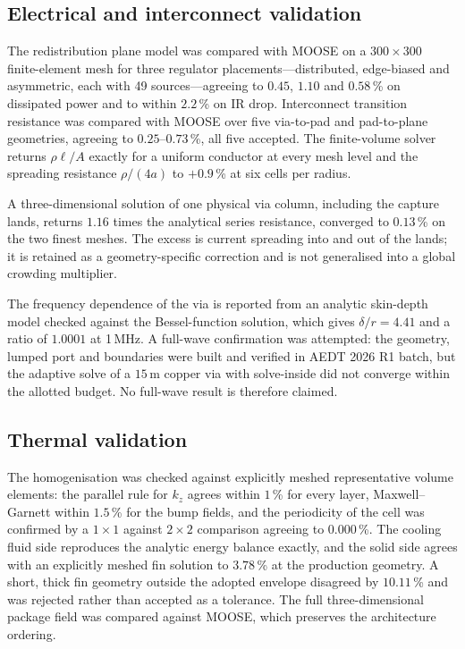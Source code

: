 \documentclass[journal]{IEEEtran}
\begin{document}
\subsection{Electrical and interconnect validation}
The redistribution plane model was compared with MOOSE on a $300\times300$ finite-element
mesh for three regulator placements---distributed, edge-biased and asymmetric, each with 49
sources---agreeing to $0.45$, $1.10$ and $0.58$\,\% on dissipated power and to within
$2.2$\,\% on IR drop. Interconnect transition resistance was compared with MOOSE over five
via-to-pad and pad-to-plane geometries, agreeing to $0.25$--$0.73$\,\%, all five accepted.
The finite-volume solver returns $\rho\ell/A$ exactly for a uniform conductor at every mesh
level and the spreading resistance $\rho/(4a)$ to $+0.9$\,\% at six cells per radius.

A three-dimensional solution of one physical via column, including the capture lands,
returns $1.16$ times the analytical series resistance, converged to $0.13$\,\% on the two
finest meshes. The excess is current spreading into and out of the lands; it is retained as a
geometry-specific correction and is not generalised into a global crowding multiplier.

The frequency dependence of the via is reported from an analytic skin-depth model checked
against the Bessel-function solution, which gives $\delta/r = 4.41$ and a ratio of $1.0001$
at 1\,MHz. A full-wave confirmation was attempted: the geometry, lumped port and boundaries
were built and verified in AEDT 2026 R1 batch, but the adaptive solve of a
$15$\,\textmu m copper via with solve-inside did not converge within the allotted budget. No
full-wave result is therefore claimed.

\subsection{Thermal validation}
The homogenisation was checked against explicitly meshed representative volume elements: the
parallel rule for $k_{z}$ agrees within $1$\,\% for every layer, Maxwell--Garnett within
$1.5$\,\% for the bump fields, and the periodicity of the cell was confirmed by a $1\times1$
against $2\times2$ comparison agreeing to $0.000$\,\%. The cooling fluid side reproduces the
analytic energy balance exactly, and the solid side agrees with an explicitly meshed fin
solution to $3.78$\,\% at the production geometry. A short, thick fin geometry outside the
adopted envelope disagreed by $10.11$\,\% and was rejected rather than accepted as a
tolerance. The full three-dimensional package field was compared against MOOSE, which
preserves the architecture ordering.
\end{document}
